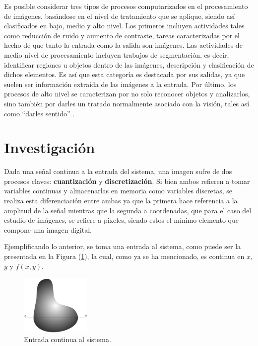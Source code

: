 Es posible considerar tres tipos de procesos computarizados en el procesamiento de imágenes, basándose en el nivel de tratamiento que se aplique, siendo así clasificados en bajo, medio y alto nivel. Los primeros incluyen actividades tales como reducción de ruido y aumento de contraste, tareas caracterizadas por el hecho de que tanto la entrada como la salida son imágenes. Las actividades de medio nivel de procesamiento incluyen trabajos de segmentación, es decir, identificar regiones u objetos dentro de las imágenes, descripción y clasificación de dichos elementos. Es así que esta categoría es destacada por sus salidas, ya que suelen ser información extraída de las imágenes a la entrada. Por último, los procesos de alto nivel se caracterizan por no solo reconocer objetos y analizarlos, sino también por darles un tratado normalmente asociado con la visión, tales así como ``darles sentido'' \cite{ref:intro1}.
	
	
\section{Investigación}
Dada una señal continua a la entrada del sistema, una imagen sufre de dos procesos claves: \textbf{cuantización} y \textbf{discretización}. Si bien ambos refieren a tomar variables continuas y almacenarlas en memoria como variables discretas, se realiza esta diferenciación entre ambas ya que la primera hace referencia a la amplitud de la señal mientras que la segunda a coordenadas, que para el caso del estudio de imágenes, se refiere a pixeles, siendo estos el mínimo elemento que compone una imagen digital.
	
Ejemplificando lo anterior, se toma una entrada al sistema, como puede ser la presentada en la Figura (\ref{fig:disc1}), la cual, como ya se ha mencionado, es continua en $x$, $y$ y $f(x,y)$.
\begin{figure}[H]
\centering
	\includegraphics[width=0.3\textwidth]{Imagenes/Digitalizacion_1.png}
	\caption{Entrada continua al sistema.}
	\label{fig:disc1}
\end{figure}

